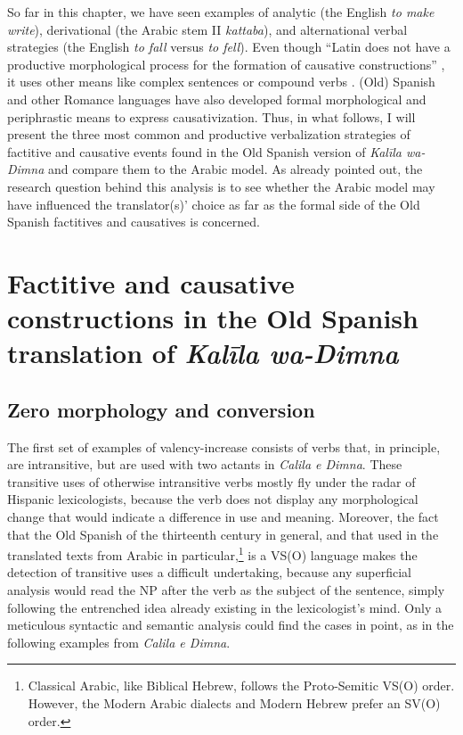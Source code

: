 \documentclass[output=paper]{langscibook}
\begin{document}
So far in this chapter, we have seen examples of analytic (the English \textit{to make write}), derivational (the Arabic stem II \textit{kattaba}), and alternational verbal strategies (the English \textit{to fall} versus \textit{to fell}). Even though “Latin does not have a productive morphological process for the formation of causative constructions” \citep[918]{lehmann_latin_2016}, it uses other means like complex sentences or compound verbs \citep{hoffmann_lateinische_2018,lehmann_latin_2016}. (Old) Spanish and other Romance languages have also developed formal morphological and periphrastic means to express causativization. Thus, in what follows, I will present the three most common and productive verbalization strategies of factitive and causative events found in the Old Spanish version of \textit{Kalīla wa-Dimna} and compare them to the Arabic model. As already pointed out, the research question behind this analysis is to see whether the Arabic model may have influenced the translator(s)' choice as far as the formal side of the Old Spanish factitives and causatives is concerned.

\section{Factitive and causative constructions in the Old Spanish translation of \textit{Kalīla wa-Dimna}}\label{dohla:sec:5}
\subsection{Zero morphology and conversion}\label{dohla:sec:5.1}


The first set of examples of valency-increase consists of verbs that, in principle, are intransitive, but are used with two actants in \textit{Calila e Dimna}. These transitive uses of otherwise intransitive verbs mostly fly under the radar of Hispanic lexicologists, because the verb does not display any morphological change that would indicate a difference in use and meaning. Moreover, the fact that the Old Spanish of the thirteenth century in general, and that used in the translated texts from Arabic in particular,\footnote{Classical Arabic, like Biblical Hebrew, follows the Proto-Semitic VS(O) order. However, the Modern Arabic dialects and Modern Hebrew prefer an SV(O) order.} is a VS(O) language \citep{bossong_sintaxis_2006,lopez_garcia_como_2000,neumann-holzschuh_satzgliedanordnung_1997} makes the detection of transitive uses a difficult undertaking, because any superficial analysis would read the NP after the verb as the subject of the sentence, simply following the entrenched idea already existing in the lexicologist’s mind. Only a meticulous syntactic and semantic analysis could find the cases in point, as in the following examples from \textit{Calila e Dimna}.
\end{document}
